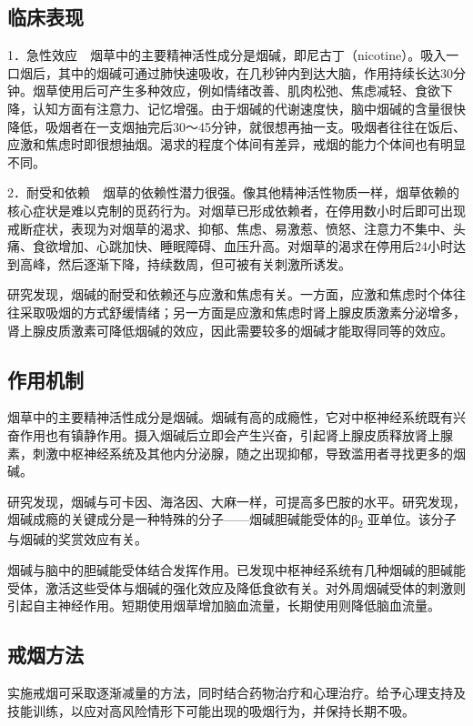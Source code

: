 \subsection{临床表现}

1．急性效应　烟草中的主要精神活性成分是烟碱，即尼古丁（nicotine）。吸入一口烟后，其中的烟碱可通过肺快速吸收，在几秒钟内到达大脑，作用持续长达30分钟。烟草使用后可产生多种效应，例如情绪改善、肌肉松弛、焦虑减轻、食欲下降，认知方面有注意力、记忆增强。由于烟碱的代谢速度快，脑中烟碱的含量很快降低，吸烟者在一支烟抽完后30～45分钟，就很想再抽一支。吸烟者往往在饭后、应激和焦虑时即很想抽烟。渴求的程度个体间有差异，戒烟的能力个体间也有明显不同。

2．耐受和依赖　烟草的依赖性潜力很强。像其他精神活性物质一样，烟草依赖的核心症状是难以克制的觅药行为。对烟草已形成依赖者，在停用数小时后即可出现戒断症状，表现为对烟草的渴求、抑郁、焦虑、易激惹、愤怒、注意力不集中、头痛、食欲增加、心跳加快、睡眠障碍、血压升高。对烟草的渴求在停用后24小时达到高峰，然后逐渐下降，持续数周，但可被有关刺激所诱发。

研究发现，烟碱的耐受和依赖还与应激和焦虑有关。一方面，应激和焦虑时个体往往采取吸烟的方式舒缓情绪；另一方面是应激和焦虑时肾上腺皮质激素分泌增多，肾上腺皮质激素可降低烟碱的效应，因此需要较多的烟碱才能取得同等的效应。

\subsection{作用机制}

烟草中的主要精神活性成分是烟碱。烟碱有高的成瘾性，它对中枢神经系统既有兴奋作用也有镇静作用。摄入烟碱后立即会产生兴奋，引起肾上腺皮质释放肾上腺素，刺激中枢神经系统及其他内分泌腺，随之出现抑郁，导致滥用者寻找更多的烟碱。

研究发现，烟碱与可卡因、海洛因、大麻一样，可提高多巴胺的水平。研究发现，烟碱成瘾的关键成分是一种特殊的分子------烟碱胆碱能受体的β\textsubscript{2}
亚单位。该分子与烟碱的奖赏效应有关。

烟碱与脑中的胆碱能受体结合发挥作用。已发现中枢神经系统有几种烟碱的胆碱能受体，激活这些受体与烟碱的强化效应及降低食欲有关。对外周烟碱受体的刺激则引起自主神经作用。短期使用烟草增加脑血流量，长期使用则降低脑血流量。

\subsection{戒烟方法}

实施戒烟可采取逐渐减量的方法，同时结合药物治疗和心理治疗。给予心理支持及技能训练，以应对高风险情形下可能出现的吸烟行为，并保持长期不吸。

